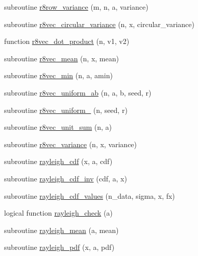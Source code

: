 \begin{DoxyCompactItemize}
subroutine \hyperlink{_bhabha__fortran__sem__doxy_8f_a3a87c9f6e18e8c777449225e06a1124e}{r8row\+\_\+variance} (m, n, a, variance)
\item 
subroutine \hyperlink{_bhabha__fortran__sem__doxy_8f_a6f5548af22c5933a7360db1eefaa985e}{r8vec\+\_\+circular\+\_\+variance} (n, x, circular\+\_\+variance)
\item 
function \hyperlink{_bhabha__fortran__sem__doxy_8f_a53818831efeb1c9cea9cda383bdfebf1}{r8vec\+\_\+dot\+\_\+product} (n, v1, v2)
\item 
subroutine \hyperlink{_bhabha__fortran__sem__doxy_8f_a3afb0bc60d390433659934e42be314b5}{r8vec\+\_\+mean} (n, x, mean)
\item 
subroutine \hyperlink{_bhabha__fortran__sem__doxy_8f_a5068c55b384e4d8de2b97c2ac9fb9f23}{r8vec\+\_\+min} (n, a, amin)
\item 
subroutine \hyperlink{_bhabha__fortran__sem__doxy_8f_a34c59b6daeb8820b723412d8d9bdf687}{r8vec\+\_\+uniform\+\_\+ab} (n, a, b, seed, r)
\item 
subroutine \hyperlink{_bhabha__fortran__sem__doxy_8f_a5e64b19c036489d0c15f5a2c7ba0e216}{r8vec\+\_\+uniform\+\_} (n, seed, r)
\item 
subroutine \hyperlink{_bhabha__fortran__sem__doxy_8f_aca8f7af53e9c8384405cbe2eecf3deb0}{r8vec\+\_\+unit\+\_\+sum} (n, a)
\item 
subroutine \hyperlink{_bhabha__fortran__sem__doxy_8f_aeac2d8faada0a83b125ddbaa53060f71}{r8vec\+\_\+variance} (n, x, variance)
\item 
subroutine \hyperlink{_bhabha__fortran__sem__doxy_8f_aaa2c63bb728acee27317c0481a5bdbdb}{rayleigh\+\_\+cdf} (x, a, cdf)
\item 
subroutine \hyperlink{_bhabha__fortran__sem__doxy_8f_a6cb29161b358879878553289cb675d94}{rayleigh\+\_\+cdf\+\_\+inv} (cdf, a, x)
\item 
subroutine \hyperlink{_bhabha__fortran__sem__doxy_8f_a638657c28d62e70530a378d9a2920ee2}{rayleigh\+\_\+cdf\+\_\+values} (n\+\_\+data, sigma, x, fx)
\item 
logical function \hyperlink{_bhabha__fortran__sem__doxy_8f_a636b798611edb695a18fcc189bbcfa8b}{rayleigh\+\_\+check} (a)
\item 
subroutine \hyperlink{_bhabha__fortran__sem__doxy_8f_a1913ce88098196a93906c3294a213a42}{rayleigh\+\_\+mean} (a, mean)
\item 
subroutine \hyperlink{_bhabha__fortran__sem__doxy_8f_aed2225b609bc0484d8a878d661ca06f5}{rayleigh\+\_\+pdf} (x, a, pdf)
\item 

\end{DoxyCompactItemize}

